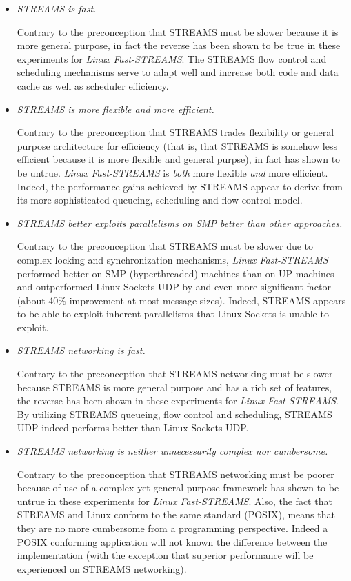 \documentclass[letterpaper,final,notitlepage,twocolumn,10pt,twoside]{article}
\begin{document}
\begin{itemize}

\item \textit{STREAMS is fast.}

Contrary to the preconception that STREAMS must be slower because it is more general purpose, in
fact the reverse has been shown to be true in these experiments for \textsl{Linux Fast-STREAMS}.
The STREAMS flow control and scheduling mechanisms serve to adapt well and increase both code and
data cache as well as scheduler efficiency.

\item \textit{STREAMS is more flexible {\em and} more efficient.}

Contrary to the preconception that STREAMS trades flexibility or general purpose architecture for
efficiency (that is, that STREAMS is somehow less efficient because it is more flexible and general
purpse), in fact has shown to be untrue.  \textsl{Linux Fast-STREAMS} is {\em both} more flexible
{\em and} more efficient.  Indeed, the performance gains achieved by  STREAMS appear to derive from
its more sophisticated queueing, scheduling and flow control model.

\item \textit{STREAMS better exploits parallelisms on SMP better than other approaches.}

Contrary to the preconception that STREAMS must be slower due to complex locking and synchronization
mechanisms, \textsl{Linux Fast-STREAMS} performed better on SMP (hyperthreaded) machines than on UP
machines and outperformed Linux Sockets UDP by and even more significant factor (about 40\%
improvement at most message sizes).  Indeed, STREAMS appears to be able to exploit inherent
parallelisms that Linux Sockets is unable to exploit.

\item \textit{STREAMS networking is fast.}

Contrary to the preconception that STREAMS networking must be slower because STREAMS is more general
purpose and has a rich set of features, the reverse has been shown in these experiments for
\textsl{Linux Fast-STREAMS}.  By utilizing STREAMS queueing, flow control and scheduling, STREAMS
UDP indeed performs better than Linux Sockets UDP.

\item \textit{STREAMS networking is neither unnecessarily complex nor cumbersome.}

Contrary to the preconception that STREAMS networking must be poorer because of use of a complex yet
general purpose framework has shown to be untrue in these experiments for \textsl{Linux
Fast-STREAMS}.  Also, the fact that STREAMS and Linux conform to the same standard (POSIX), means
that they are no more cumbersome from a programming perspective.  Indeed a POSIX conforming
application will not known the difference between the implementation (with the exception that
superior performance will be experienced on STREAMS networking).

\end{itemize}
\end{document}
